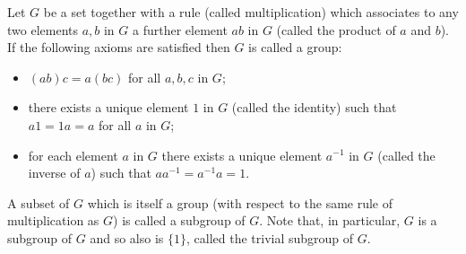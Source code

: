 Let $G$ be a set together with a rule (called multiplication) which associates to any two elements $a, b$ in $G$ a further element $ab$ in $G$ (called the product of $a$ and $b$). If the following axioms are satisfied then $G$ is called a group:

\begin{itemize}
\item[G.1.] $(ab)c = a(bc)$ for all $a, b, c$ in $G$;
\item[G.2.] there exists a unique element $1$ in $G$ (called the identity) such that $a1 = 1a = a$ for all $a$ in $G$;
\item[G.3.] for each element $a$ in $G$ there exists a unique element $a^{-1}$ in $G$ (called the inverse of $a$) such that $a a^{-1} = a^{-1}a = 1$.
\end{itemize}

A subset of $G$ which is itself a group (with respect to the same rule of multiplication as $G$) is called a subgroup of $G$. Note that, in particular, $G$ is a subgroup of $G$ and so also is $\{1\}$, called the trivial subgroup of $G$.
